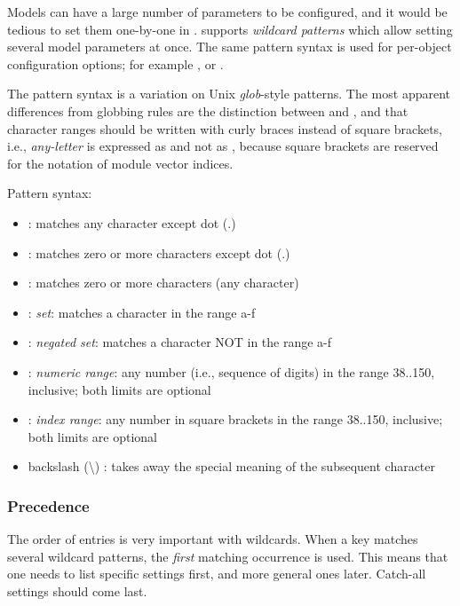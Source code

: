 Models can have a large number of parameters to be configured, and it would
be tedious to set them one-by-one in . {\opp} supports
\textit{wildcard patterns} which allow setting several model parameters
at once. The same pattern syntax is used for per-object configuration options;
for example , or .

The pattern syntax is a variation on Unix \textit{glob}-style
patterns. The most apparent differences from globbing rules are the
distinction between \ttt{*} and \ttt{**}, and that character ranges should
be written with curly braces instead of square brackets, i.e.,
\textit{any-letter} is expressed as  and not as
\ttt{[a-zA-Z]}, because square brackets are reserved for the notation of
module vector indices.

Pattern syntax:

\begin{itemize}
  \item {} : matches any character except dot (.)
  \item \ttt{*} : matches zero or more characters except dot (.)
  \item \ttt{**} : matches zero or more characters (any character)
  \item {} : \textit{set}: matches a character in the range a-f
  \item {}: \textit{negated set}: matches a character
    NOT in the range a-f
  \item {} : \textit{numeric range}: any number (i.e., sequence of digits)
    in the range 38..150, inclusive; both limits are optional
  \item \ttt{[38..150]} : \textit{index range}: any number in square brackets in the
    range 38..150, inclusive; both limits are optional
  \item backslash ({\textbackslash}) : takes away the special meaning of the
    subsequent character
\end{itemize}

\subsubsection{Precedence}
\label{sec:config-sim:precedence-of-entries}

The order of entries is very important with wildcards. When a key matches
several wildcard patterns, the \textit{first} matching occurrence
is used. This means that one needs to list specific settings first, and
more general ones later. Catch-all settings should come last.

